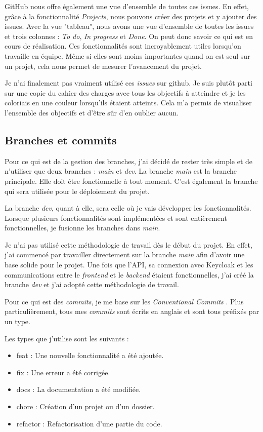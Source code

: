 GitHub nous offre également une vue d'ensemble de toutes ces issues. En effet, grâce à la fonctionnalité \emph{Projects}, nous pouvons créer des projets et y ajouter des issues. Avec la vue "tableau", nous avons une vue d'ensemble de toutes les issues et trois colonnes : \emph{To do}, \emph{In progress} et \emph{Done}. On peut donc savoir ce qui est en cours de réalisation. Ces fonctionnalités sont incroyablement utiles lorsqu'on travaille en équipe. Même si elles sont moins importantes quand on est seul sur un projet, cela nous permet de mesurer l'avancement du projet.

Je n'ai finalement pas vraiment utilisé ces \emph{issues} sur github. Je suis plutôt parti sur une copie du cahier des charges avec tous les objectifs à atteindre et je les coloriais en une couleur lorsqu'ils étaient atteints. Cela m'a permis de visualiser l'ensemble des objectifs et d'être sûr d'en oublier aucun.

\subsection{Branches et commits}
Pour ce qui est de la gestion des branches, j'ai décidé de rester très simple et de n'utiliser que deux branches : \emph{main} et \emph{dev}. La branche \emph{main} est la branche principale. Elle doit être fonctionnelle à tout moment. C'est également la branche qui sera utilisée pour le déploiement du projet.

La branche \emph{dev}, quant à elle, sera celle où je vais développer les fonctionnalités. Lorsque plusieurs fonctionnalités sont implémentées et sont entièrement fonctionnelles, je fusionne les branches dans \emph{main}.

Je n'ai pas utilisé cette méthodologie de travail dès le début du projet. En effet, j'ai commencé par travailler directement sur la branche \emph{main} afin d'avoir une base solide pour le projet. Une fois que l'API, sa connexion avec Keycloak et les communications entre le \emph{frontend} et le \emph{backend} étaient fonctionnelles, j'ai créé la branche \emph{dev} et j'ai adopté cette méthodologie de travail.

Pour ce qui est des \emph{commits}, je me base sur les \emph{Conventional Commits} \cite{ConventionalCommits}. Plus particulièrement, tous mes \emph{commits} sont écrits en anglais et sont tous préfixés par un type.

Les types que j'utilise sont les suivants :
\begin{itemize}
    \item feat : Une nouvelle fonctionnalité a été ajoutée.
    \item fix : Une erreur a été corrigée.
    \item docs : La documentation a été modifiée.
    \item chore : Création d'un projet ou d'un dossier.
    \item refactor : Refactorisation d'une partie du code.
\end{itemize}

